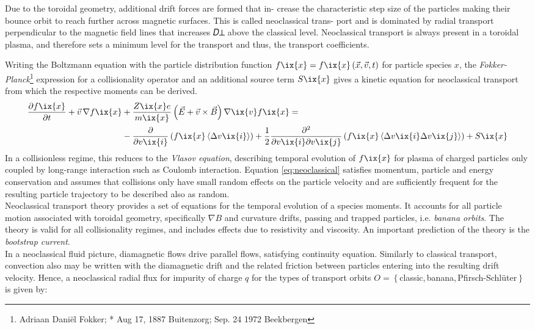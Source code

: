 Due to the toroidal geometry, additional drift forces are formed that in-
crease the characteristic step size of the particles making their bounce orbit
to reach further across magnetic surfaces. This is called neoclassical trans-
port and is dominated by radial transport perpendicular to the magnetic
field lines that increases 𝐷⟂ above the classical level. Neoclassical transport
is always present in a toroidal plasma, and therefore sets a minimum level
for the transport and thus, the transport coefficients.


                Writing the Boltzmann equation with the particle distribution function $f\ix{x}=f\ix{x}\left(\vec{x},\vec{v},t\right)$ for particle species $x$, the \textit{Fokker-Planck}\footnote[1]{Adriaan Daniël Fokker; * Aug 17, 1887 Buitenzorg; \textdagger Sep. 24 1972 Beekbergen} expression for a collisionality operator and an additional source term $S\ix{x}$ gives a kinetic equation for neoclassical transport from which the respective moments can be derived\cite{WikiFokkerPlanck}.%
%
                \begin{align}%
                    \frac{\partial f\ix{x}}{\partial t}+\vec{v}\,\nabla f\ix{x}&+\frac{Z\ix{x}e}{m\ix{x}}\left(\vec{E}+\vec{v}\times\vec{B}\right)\nabla\ix{v}f\ix{x}=\nonumber\\%
                    &-\frac{\partial}{\partial v\ix{i}}\left(f\ix{x}\left\langle\Delta v\ix{i}\right\rangle\right)+\frac{1}{2}\frac{\partial^{2}}{\partial v\ix{i}\partial v\ix{j}}\left(f\ix{x}\left\langle\Delta v\ix{i}\Delta v\ix{j}\right\rangle\right)+S\ix{x}\label{eq:neoclassical}%
                \end{align}%
%
                In a collisionless regime, this reduces to the \textit{Vlasov equation}, describing temporal evolution of $f\ix{x}$ for plasma of charged particles only coupled by long-range interaction such as Coulomb interaction\cite{WikiVlasov}. Equation \ref{eq:neoclassical} satisfies momentum, particle and energy conservation and assumes that collisions only have small random effects on the particle velocity and are sufficiently frequent for the resulting particle trajectory to be described also as random.\\%
                Neoclassical transport theory provides a set of equations for the temporal evolution of a species moments. It accounts for all particle motion associated with toroidal geometry, specifically $\nabla B$ and curvature drifts, passing and trapped particles, i.e. \textit{banana orbits}. The theory is valid for all collisionality regimes, and includes effects due to resistivity and viscosity. An important prediction of the theory is the \textit{bootstrap current}\cite{Houlberg1997,Tribaldos2005,Fulop2001}.\\%
                In a neoclassical fluid picture, diamagnetic flows drive parallel flows, satisfying continuity equation. Similarly to classical transport, convection also may be written with the diamagnetic drift and the related friction between particles entering into the resulting drift velocity. Hence, a neoclassical radial flux for impurity of charge $q$ for the types of transport orbits $O=\left\{\right.$classic,\,banana,\,Pfirsch-Schlüter$\left.\right\}$ is given by:

